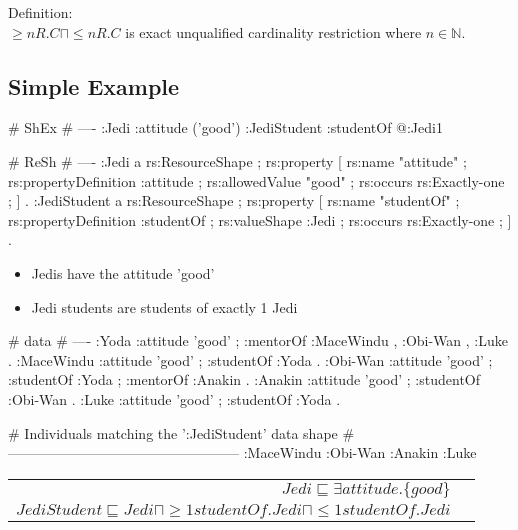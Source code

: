 \documentclass{llncs}
\newenvironment{DL}{
	\begin{center}
  \begin{tabular}{r l}

}{
  \end{tabular}
	\end{center}
}
\newcommand{\tb}[1]{\todo[size=\small, color=blue!40]{\textbf{Thomas:} #1}}
\begin{document}
Definition:\\

$\geq n R. C \sqcap \leq n R. C $ is exact unqualified cardinality restriction where $n \in \mathbb{N}$.
\subsection{Simple Example}


\begin{ex}
# ShEx
# ----
:Jedi {
    :attitude ('good') }
:JediStudent {
    :studentOf @:Jedi{1} }
\end{ex}

\begin{ex}
# ReSh
# ----
:Jedi a rs:ResourceShape ;
    rs:property [
        rs:name "attitude" ;
        rs:propertyDefinition :attitude ;
        rs:allowedValue "good" ;
        rs:occurs rs:Exactly-one ;
    ] .
:JediStudent a rs:ResourceShape ;
    rs:property [
        rs:name "studentOf" ;
        rs:propertyDefinition :studentOf ;
        rs:valueShape :Jedi ;
        rs:occurs rs:Exactly-one ;
    ] .
\end{ex}

\begin{itemize}
	\item Jedis have the attitude 'good'
	\item Jedi students are students of exactly 1 Jedi
\end{itemize}

\begin{ex}
# data
# ----
:Yoda 
    :attitude 'good' ;
    :mentorOf :MaceWindu , :Obi-Wan , :Luke .
:MaceWindu
    :attitude 'good' ;
    :studentOf :Yoda .
:Obi-Wan 
    :attitude 'good' ;
    :studentOf :Yoda ;
    :mentorOf :Anakin .
:Anakin
    :attitude 'good' ; 
    :studentOf :Obi-Wan .
:Luke
    :attitude 'good' ;
    :studentOf :Yoda .
\end{ex}

\begin{ex}
# Individuals matching the ’:JediStudent’ data shape
# --------------------------------------------------
:MaceWindu :Obi-Wan :Anakin :Luke
\end{ex}

\begin{DL}
$Jedi \sqsubseteq \exists attitude.\{good\} $\\
$JediStudent \sqsubseteq Jedi \sqcap \geq1 studentOf.Jedi \sqcap \leq1 studentOf.Jedi$ \\
\end{DL}
\end{document}
